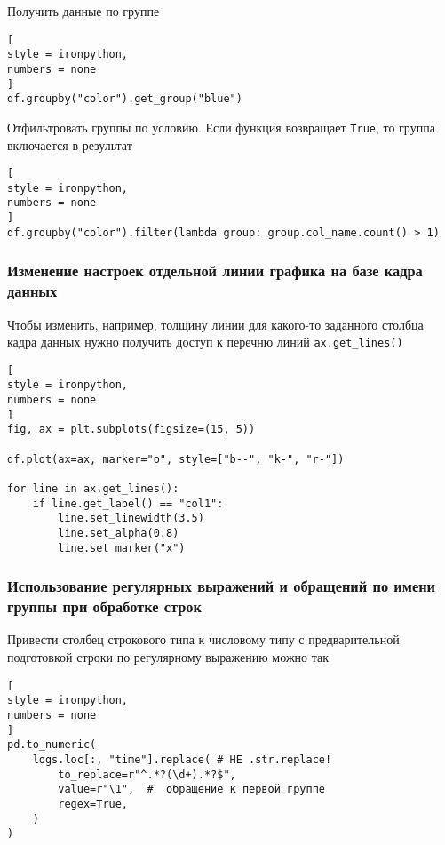 \documentclass[%
	11pt,
	a4paper,
	utf8,
		]{article}
\begin{document}
Получить данные по группе
\begin{lstlisting}[
style = ironpython,
numbers = none
]
df.groupby("color").get_group("blue")
\end{lstlisting}

Отфильтровать группы по условию. Если функция возвращает \texttt{True}, то группа включается в результат
\begin{lstlisting}[
style = ironpython,
numbers = none
]
df.groupby("color").filter(lambda group: group.col_name.count() > 1)
\end{lstlisting}

\subsubsection{Изменение настроек отдельной линии графика на базе кадра данных}
Чтобы изменить, например, толщину линии для какого-то заданного столбца кадра данных нужно получить доступ к перечню линий \verb|ax.get_lines()|
\begin{lstlisting}[
style = ironpython,
numbers = none
]
fig, ax = plt.subplots(figsize=(15, 5))

df.plot(ax=ax, marker="o", style=["b--", "k-", "r-"])

for line in ax.get_lines():
    if line.get_label() == "col1":
        line.set_linewidth(3.5)
        line.set_alpha(0.8)
        line.set_marker("x")
\end{lstlisting}

\subsubsection{Использование регулярных выражений и обращений по имени группы при обработке строк}

Привести столбец строкового типа к числовому типу с предварительной подготовкой строки по регулярному выражению можно так
\begin{lstlisting}[
style = ironpython,
numbers = none	
]
pd.to_numeric(
    logs.loc[:, "time"].replace( # НЕ .str.replace!
        to_replace=r"^.*?(\d+).*?$",
        value=r"\1",  #  обращение к первой группе
        regex=True,
    )
)
\end{lstlisting}
\end{document}
